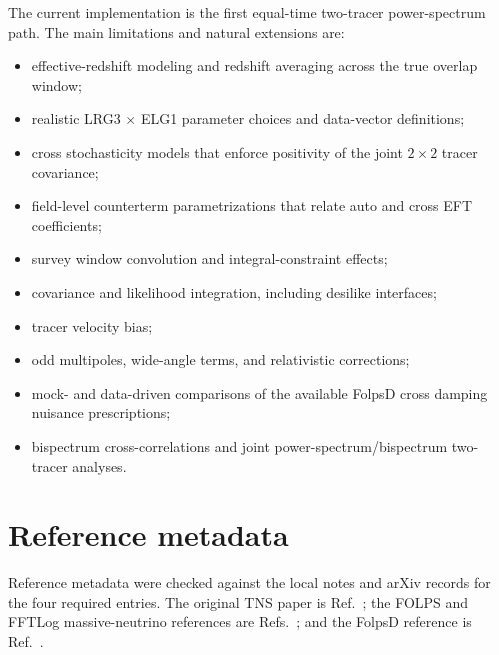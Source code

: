 \documentclass[11pt]{article}
\begin{document}
The current implementation is the first equal-time two-tracer power-spectrum
path.  The main limitations and natural extensions are:
\begin{itemize}[leftmargin=1.6em]
  \item effective-redshift modeling and redshift averaging across the true
        overlap window;
  \item realistic LRG3 $\times$ ELG1 parameter choices and data-vector
        definitions;
  \item cross stochasticity models that enforce positivity of the joint
        $2\times2$ tracer covariance;
  \item field-level counterterm parametrizations that relate auto and cross EFT
        coefficients;
  \item survey window convolution and integral-constraint effects;
  \item covariance and likelihood integration, including desilike interfaces;
  \item tracer velocity bias;
  \item odd multipoles, wide-angle terms, and relativistic corrections;
  \item mock- and data-driven comparisons of the available FolpsD cross
        damping nuisance prescriptions;
  \item bispectrum cross-correlations and joint power-spectrum/bispectrum
        two-tracer analyses.
\end{itemize}

\section{Reference metadata}

Reference metadata were checked against the local notes and arXiv records for
the four required entries.  The original TNS paper is
Ref.~\cite{Taruya2010}; the FOLPS and FFTLog massive-neutrino references are
Refs.~\cite{Aviles2021,Noriega2022}; and the FolpsD reference is
Ref.~\cite{Bansal2026}.



\end{document}
